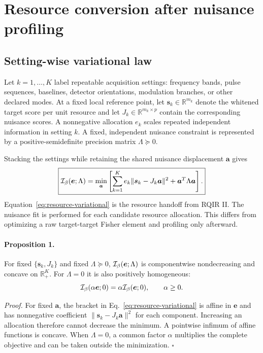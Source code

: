 \section{Resource conversion after nuisance profiling}
\label{sec:resource-theory}

\subsection{Setting-wise variational law}

Let $k=1,\ldots,K$ label repeatable acquisition settings: frequency bands, pulse sequences, baselines, detector orientations, modulation branches, or other declared modes. At a fixed local reference point, let $\bm s_k\in\mathbb R^{m_k}$ denote the whitened target score per unit resource and let $J_k\in\mathbb R^{m_k\times p}$ contain the corresponding nuisance scores. A nonnegative allocation $e_k$ scales repeated independent information in setting $k$. A fixed, independent nuisance constraint is represented by a positive-semidefinite precision matrix $\Lambda\succeq0$.

Stacking the settings while retaining the shared nuisance displacement $\bm a$ gives
\begin{equation}
\boxed{
\mathcal I_{\beta}(\bm e;\Lambda)=
\min_{\bm a}
\left[
\sum_{k=1}^{K}e_k\|\bm s_k-J_k\bm a\|^2
+\bm a^T\Lambda\bm a
\right].
}
\label{eq:resource-variational}
\end{equation}
Equation~\eqref{eq:resource-variational} is the resource handoff from RQIR II. The nuisance fit is performed for each candidate resource allocation. This differs from optimizing a raw target-target Fisher element and profiling only afterward.

\paragraph*{Proposition 1.}
For fixed $\{\bm s_k,J_k\}$ and fixed $\Lambda\succeq0$, $\mathcal I_{\beta}(\bm e;\Lambda)$ is componentwise nondecreasing and concave on $\mathbb R_+^K$. For $\Lambda=0$ it is also positively homogeneous:
\begin{equation}
\mathcal I_{\beta}(\alpha\bm e;0)=\alpha\mathcal I_{\beta}(\bm e;0),\qquad \alpha\ge0.
\label{eq:homogeneity}
\end{equation}

\emph{Proof.} For fixed $\bm a$, the bracket in Eq.~\eqref{eq:resource-variational} is affine in $\bm e$ and has nonnegative coefficient $\|\bm s_k-J_k\bm a\|^2$ for each component. Increasing an allocation therefore cannot decrease the minimum. A pointwise infimum of affine functions is concave. When $\Lambda=0$, a common factor $\alpha$ multiplies the complete objective and can be taken outside the minimization. \hfill$\square$

